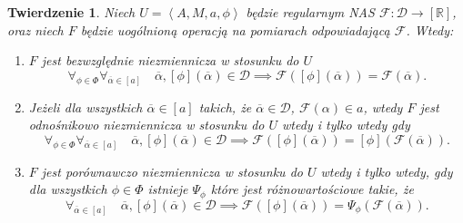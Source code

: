 \documentclass[12pt,a4paper]{report}
\newtheorem{tw}[definition]{Twierdzenie}
\newcommand{\domkniecie}[1]{\left\lbrack{#1}\right\rbrack}
\newcommand{\tuple}[1]{\left\langle {#1} \right\rangle}
\begin{document}
\begin{tw}
Niech $U=\tuple{A,M,a,\phi}$ będzie regularnym NAS $\mathcal{F}:\mathcal{D}\to \domkniecie{\mathbb{R}}$, oraz niech $F$ będzie uogólnioną operacją na pomiarach odpowiadającą $\mathcal{F}$. Wtedy:
\begin{enumerate}
\item
$F$ jest bezwzględnie niezmiennicza w stosunku do $U$ 
$$
\forall_{\phi \in \Phi} \forall_{\overline{\alpha} \in \domkniecie{a}} \quad \overline{\alpha}, \domkniecie{\phi}(\overline{\alpha}) \in \mathcal{D} \implies \mathcal{F}(\domkniecie{\phi}(\overline{\alpha}))=\mathcal{F}(\overline{\alpha}).
$$
\item
Jeżeli dla wszystkich $\overline{\alpha} \in \domkniecie{a}$ takich, że $\overline{\alpha} \in \mathcal{D}$, $\mathcal{F}(\alpha)\in a$, wtedy $F$ jest odnośnikowo niezmiennicza w stosunku do $U$ wtedy i tylko wtedy gdy 
\begin{equation*}
\forall_{\phi \in \Phi} \forall_{\overline{\alpha} \in \domkniecie{a}} \quad \overline{\alpha}, \domkniecie{\phi}(\overline{\alpha}) \in \mathcal{D} \implies \mathcal{F}(\domkniecie{\phi}(\overline{\alpha}))=\domkniecie{\phi}(\mathcal{F}(\overline{\alpha})).
\end{equation*}
\item
$F$ jest porównawczo niezmiennicza w stosunku do $U$ wtedy i tylko wtedy, gdy dla wszystkich $\phi \in \Phi$ istnieje $\Psi_{\phi}$ które jest różnowartościowe takie, że
$$
 \forall_{\overline{\alpha} \in \domkniecie{a}} \quad \overline{\alpha}, \domkniecie{\phi}(\overline{\alpha}) \in \mathcal{D} \implies \mathcal{F}(\domkniecie{\phi}(\overline{\alpha}))=\Psi_{\phi}(\mathcal{F}(\overline{\alpha})).
$$
\end{enumerate}
\end{tw}
\end{document}
